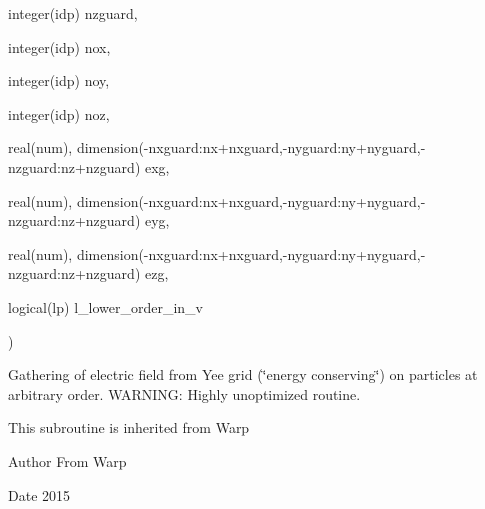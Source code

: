 {\begin{DoxyParamCaption}
\item[{integer(idp)}]{nzguard, }
\item[{integer(idp)}]{nox, }
\item[{integer(idp)}]{noy, }
\item[{integer(idp)}]{noz, }
\item[{real(num), dimension(-\/nxguard\+:nx+nxguard,-\/nyguard\+:ny+nyguard,-\/nzguard\+:nz+nzguard)}]{exg, }
\item[{real(num), dimension(-\/nxguard\+:nx+nxguard,-\/nyguard\+:ny+nyguard,-\/nzguard\+:nz+nzguard)}]{eyg, }
\item[{real(num), dimension(-\/nxguard\+:nx+nxguard,-\/nyguard\+:ny+nyguard,-\/nzguard\+:nz+nzguard)}]{ezg, }
\item[{logical(lp)}]{l\+\_\+lower\+\_\+order\+\_\+in\+\_\+v}
\end{DoxyParamCaption}
)}\hypertarget{field__gathering_8_f90_aff764c0eb8ae48e31d7bb6f39467cabf}{}\label{field__gathering_8_f90_aff764c0eb8ae48e31d7bb6f39467cabf}


Gathering of electric field from Yee grid (\char`\"{}energy conserving\char`\"{}) on particles at arbitrary order. W\+A\+R\+N\+I\+NG\+: Highly unoptimized routine. 

This subroutine is inherited from Warp \begin{DoxyAuthor}{Author}
From Warp 
\end{DoxyAuthor}
\begin{DoxyDate}{Date}
2015 
\end{DoxyDate}
